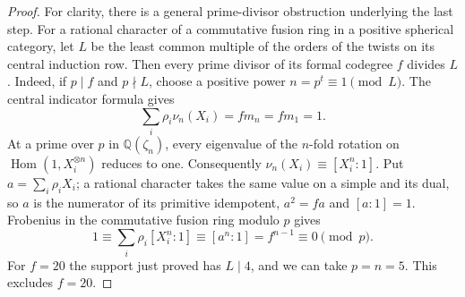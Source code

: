 \documentclass[11pt,a4paper]{article}
\numberwithin{equation}{section}
\begin{document}
\begin{proof}
For clarity, there is a general prime-divisor obstruction underlying the last step. For a rational character of a commutative fusion ring in a positive spherical category, let $L$ be the least common multiple of the orders of the twists on its central induction row. Then every prime divisor of its formal codegree $f$ divides $L$. Indeed, if $p\mid f$ and $p\nmid L$, choose a positive power $n=p^t\equiv1\pmod L$. The central indicator formula gives
\[
  \sum_i\rho_i\nu_n(X_i)=fm_n=fm_1=1.
\]
At a prime over $p$ in $\mathbb Q(\zeta_n)$, every eigenvalue of the $n$-fold rotation on $\operatorname{Hom}(1,X_i^{\otimes n})$ reduces to one. Consequently $\nu_n(X_i)\equiv[X_i^n:1]$. Put $a=\sum_i\rho_i X_i$; a rational character takes the same value on a simple and its dual, so $a$ is the numerator of its primitive idempotent, $a^2=fa$ and $[a:1]=1$. Frobenius in the commutative fusion ring modulo $p$ gives
\[
 1\equiv\sum_i\rho_i[X_i^n:1]\equiv[a^n:1]=f^{n-1}\equiv0\pmod p.
\]
For $f=20$ the support just proved has $L\mid4$, and we can take $p=n=5$. This excludes $f=20$.
\end{proof}
\end{document}
